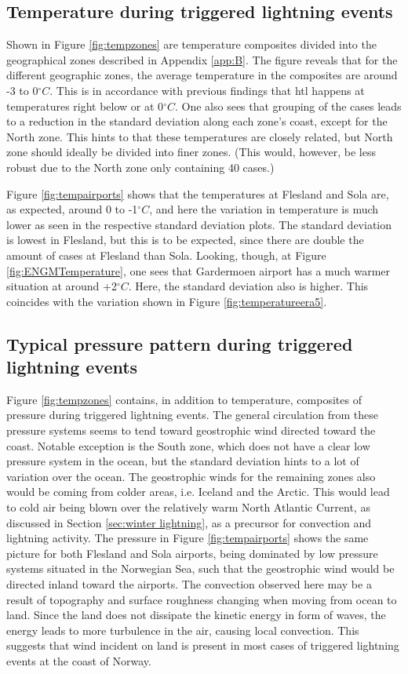 \subsection{Temperature during triggered lightning events} \label{sec:compositesera5}
Shown in Figure \ref{fig:tempzones} are temperature composites divided into the geographical zones described in Appendix \ref{app:B}. The figure reveals that for the different geographic zones, the average temperature in the composites are around -3 to 0$^{\circ}C$. This is in accordance with previous findings that \acrshort{htl} happens at temperatures right below or at 0$^{\circ}C$. One also sees that grouping of the cases leads to a reduction in the standard deviation along each zone's coast, except for the North zone. This hints to that these temperatures are closely related, but North zone should ideally be divided into finer zones. (This would, however, be less robust due to the North zone only containing 40 cases.)

Figure \ref{fig:tempairports} shows that the temperatures at Flesland and Sola are, as expected, around 0 to -1$^{\circ}C$, and here the variation in temperature is much lower as seen in the respective standard deviation plots. The standard deviation is lowest in Flesland, but this is to be expected, since there are double the amount of cases at Flesland than Sola. Looking, though, at Figure \ref{fig:ENGMTemperature}, one sees that Gardermoen airport has a much warmer situation at around +2$^{\circ}C$. Here, the standard deviation also is higher. This coincides with the variation shown in Figure \ref{fig:temperatureera5}. 

\subsection{Typical pressure pattern during triggered lightning events}\label{sec:pressure}
Figure \ref{fig:tempzones} contains, in addition to temperature, composites of pressure during triggered lightning events. The general circulation from these pressure systems seems to tend toward geostrophic wind directed toward the coast. Notable exception is the South zone, which does not have a clear low pressure system in the ocean, but the standard deviation hints to a lot of variation over the ocean. The geostrophic winds for the remaining zones also would be coming from colder areas, i.e. Iceland and the Arctic. This would lead to cold air being blown over the relatively warm North Atlantic Current, as discussed in Section \ref{sec:winter lightning}, as a precursor for convection and lightning activity. The pressure in Figure \ref{fig:tempairports} shows the same picture for both Flesland and Sola airports, being dominated by low pressure systems situated in the Norwegian Sea, such that the geostrophic wind would be directed inland toward the airports. The convection observed here may be a result of topography and surface roughness changing when moving from ocean to land. Since the land does not dissipate the kinetic energy in form of waves, the energy leads to more turbulence in the air, causing local convection. This suggests that wind incident on land is present in most cases of triggered lightning events at the coast of Norway. 

